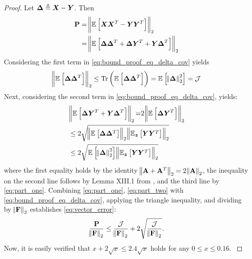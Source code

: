 \begin{proof}
    {Let $\vDelta \triangleq \Xr-\Yr$. Then
    \begin{align}\label{eq:bound_proof_eq_delta_cov}
 \matsym{P}&=\norm{\expectation{\Xr\Xr^T -\Yr\Yr^T}{}}_2 \nonumber\\
 &=
 \norm{\expectation{\vDelta\vDelta^T +\vDelta\Yr^T + \Yr \vDelta^T}{}}_2
    \end{align}
    }
    Considering
    the first term in \eqref{eq:bound_proof_eq_delta_cov} yields
    {\begin{equation}\label{eq:part_one}
        \norm{\mathbb{E}_{}\left[\bm{\Delta}\bm{\Delta}^T\right]}_2 \leq 
        \mathrm{Tr}\left(\mathbb{E}_{}\left[{\bm{\Delta}\bm{\Delta}^T}\right]\right) =  \mathbb{E}_{}\left[\norm{\bm{\Delta}}_2^2\right]=\mathcal{J}
        \end{equation}
    }
    Next, {considering}  the second term in \eqref{eq:bound_proof_eq_delta_cov}, yields:
    \begin{align}\label{eq:part_two}
        &\norm{\expectation{\vDelta\Yr^T+\Yr\vDelta^T}{}}_2 
        {=} 2 \norm{\expectation{\vDelta\Yr^T}{}}_2\nonumber\\
        &\leq 2\sqrt{\norm{\expectation{\vDelta\vDelta^T}{}}_2\norm{\expectation{\Yr\Yr^T}{\z}}_2}\nonumber\\
        &\leq 2\sqrt{\expectation{\norm{\vDelta}_2^2}{}\norm{\expectation{\Yr\Yr^T}{\z}}_2}
    \end{align}
    where the first equality holds by the identity $\norm{\mathbf{A} + \mathbf{A}^T}_2 = 2\norm{\mathbf{A}}_2$, the inequality on the second line follows by Lemma XIII.1 from \cite{habi2023learning}, and the third line by \eqref{eq:part_one}.
    Combining \eqref{eq:part_one}, \eqref{eq:part_two} with \eqref{eq:bound_proof_eq_delta_cov}, {applying the triangle inequality,} and dividing by $\norm{\mathbf{F}}_2$ {establishes \eqref{eq:vector_error}}:
    \begin{equation}\label{eq:covar_error_full}
        \frac{\mathbf{P}}{\norm{\mathbf{F}}_2}\leq\frac{\mathcal{J}}{\norm{\mathbf{F}}_2}+2\sqrt{\frac{\mathcal{J}}{\norm{\mathbf{F}}_2}}.
    \end{equation}
   {Now, it is easily verified that $x + 2 \sqrt{x} \leq 2.4 \sqrt{x} $ holds for any $0 \leq x \leq 0.16$. 
}
\end{proof}
